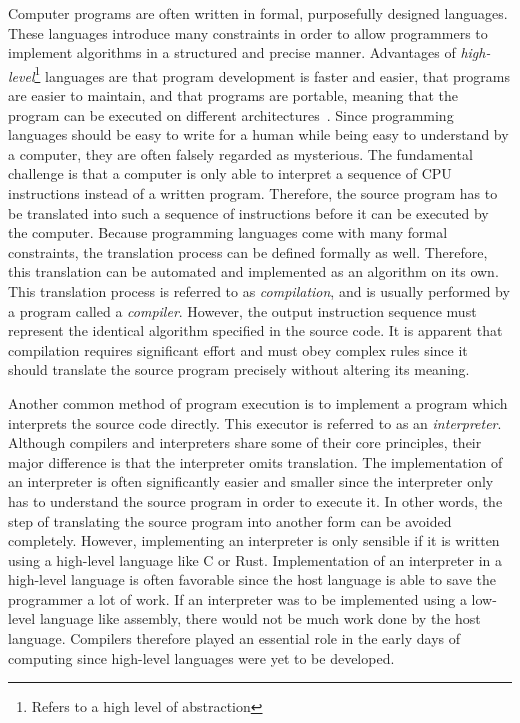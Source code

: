 Computer programs are often written in formal, purposefully designed languages.
These languages introduce many constraints in order to allow
programmers to implement algorithms in a structured and precise manner.
Advantages of \emph{high-level}\footnote{Refers to a high level of abstraction} languages
are that program development is faster and easier, that programs are easier to maintain, and that programs are portable,
meaning that the program can be executed on different architectures~\cite[p.~9]{Dandamudi2005Risc}.
Since programming languages should be easy to write for a human while being easy to understand by a computer,
they are often falsely regarded as mysterious.
The fundamental challenge is that a computer is only able to interpret a sequence of CPU instructions instead of a written program.
Therefore, the source program has to be translated into such a sequence of instructions before it can be executed by the computer.
Because programming languages come with many formal constraints, the translation process can be defined formally as well.
Therefore, this translation can be automated and implemented as an algorithm on its own.
This translation process is referred to as \emph{compilation}, and is usually performed by a program called a \emph{compiler}.
However, the output instruction sequence must represent the identical algorithm specified in the source code.
It is apparent that compilation requires significant effort and must obey complex rules
since it should translate the source program precisely without altering its meaning.

Another common method of program execution is to implement a program which interprets the source code directly.
This executor is referred to as an \emph{interpreter}.
Although compilers and interpreters share some of their core principles, their major difference is that the interpreter omits translation.
The implementation of an interpreter is often significantly easier and smaller since the interpreter only has to understand the source program in order to execute it.
In other words, the step of translating the source program into another form can be avoided completely.
However, implementing an interpreter is only sensible if it is written using a high-level language like C or Rust.
Implementation of an interpreter in a high-level language is often favorable since the host language is able to save the programmer a lot of work.
If an interpreter was to be implemented using a low-level language like assembly, there would not be much work done by the host language.
Compilers therefore played an essential role in the early days of computing since high-level languages were yet to be developed.

